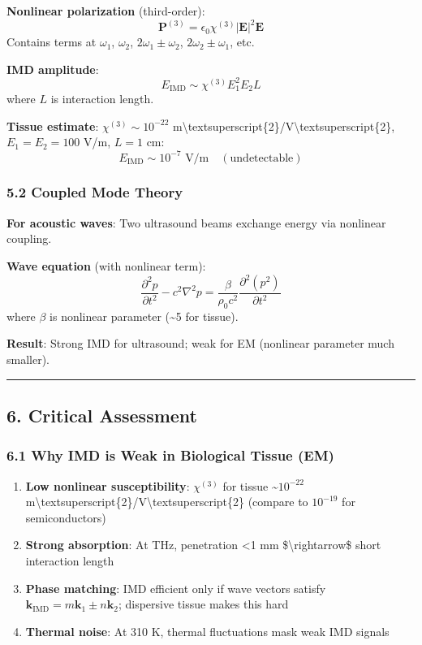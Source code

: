 \textbf{Nonlinear polarization} (third-order):
\[\mathbf{P}^{(3)} = \epsilon_0 \chi^{(3)} |\mathbf{E}|^2 \mathbf{E}\]
Contains terms at \(\omega_1\), \(\omega_2\),
\(2\omega_1 \pm \omega_2\), \(2\omega_2 \pm \omega_1\), etc.

\textbf{IMD amplitude}: \[E_{\text{IMD}} \sim \chi^{(3)} E_1^2 E_2 L\]
where \(L\) is interaction length.

\textbf{Tissue estimate}: \(\chi^{(3)} \sim 10^{-22}\)
m\textbackslash textsuperscript\{2\}/V\textbackslash textsuperscript\{2\},
\(E_1 = E_2 = 100\) V/m, \(L = 1\) cm:
\[E_{\text{IMD}} \sim 10^{-7} \text{ V/m} \quad (\text{undetectable})\]

\subsubsection{5.2 Coupled Mode Theory}\label{coupled-mode-theory}

\textbf{For acoustic waves}: Two ultrasound beams exchange energy via
nonlinear coupling.

\textbf{Wave equation} (with nonlinear term):
\[\frac{\partial^2 p}{\partial t^2} - c^2 \nabla^2 p = \frac{\beta}{\rho_0 c^2} \frac{\partial^2 (p^2)}{\partial t^2}\]
where \(\beta\) is nonlinear parameter (\textasciitilde5 for tissue).

\textbf{Result}: Strong IMD for ultrasound; weak for EM (nonlinear
parameter much smaller).

\begin{center}\rule{0.5\linewidth}{0.5pt}\end{center}

\subsection{6. Critical Assessment}\label{critical-assessment}

\subsubsection{6.1 Why IMD is Weak in Biological Tissue
(EM)}\label{why-imd-is-weak-in-biological-tissue-em}

\begin{enumerate}
\def\labelenumi{\arabic{enumi}.}
\tightlist
\item
  \textbf{Low nonlinear susceptibility}: \(\chi^{(3)}\) for tissue
  \textasciitilde{}\(10^{-22}\)
  m\textbackslash textsuperscript\{2\}/V\textbackslash textsuperscript\{2\}
  (compare to \(10^{-19}\) for semiconductors)
\item
  \textbf{Strong absorption}: At THz, penetration \textless1 mm
  \$\textbackslash rightarrow\$ short interaction length
\item
  \textbf{Phase matching}: IMD efficient only if wave vectors satisfy
  \(\mathbf{k}_{\text{IMD}} = m\mathbf{k}_1 \pm n\mathbf{k}_2\);
  dispersive tissue makes this hard
\item
  \textbf{Thermal noise}: At 310 K, thermal fluctuations mask weak IMD
  signals
\end{enumerate}

